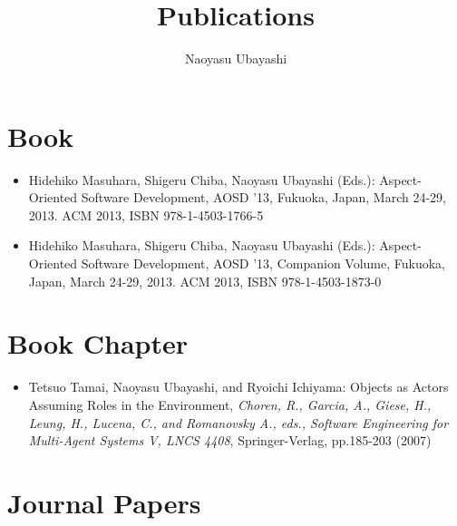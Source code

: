 \documentclass{article}
\begin{document}
\title{Publications}
\author{Naoyasu Ubayashi}
\maketitle


\section{Book}
\begin{itemize}
\item Hidehiko Masuhara, Shigeru Chiba, Naoyasu Ubayashi (Eds.): Aspect-Oriented Software Development, AOSD '13, Fukuoka, Japan, March 24-29, 2013. ACM 2013, ISBN 978-1-4503-1766-5

\item Hidehiko Masuhara, Shigeru Chiba, Naoyasu Ubayashi (Eds.): Aspect-Oriented Software Development, AOSD '13, Companion Volume, Fukuoka, Japan, March 24-29, 2013. ACM 2013, ISBN 978-1-4503-1873-0
\end{itemize}


\section{Book Chapter}

\begin{itemize}
\item Tetsuo Tamai, Naoyasu Ubayashi, and Ryoichi Ichiyama:
Objects as Actors Assuming Roles in the Environment,
{\em Choren, R., Garcia, A., Giese, H., Leung, H., Lucena, C., and Romanovsky
A., eds., Software Engineering for Multi-Agent Systems V,
LNCS 4408}, Springer-Verlag, pp.185-203 (2007)
\end{itemize}


\section{Journal Papers}
\end{document}
